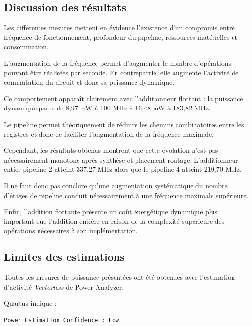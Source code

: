 \documentclass[12pt,a4paper]{article}
\begin{document}
\subsection{Discussion des résultats}

Les différentes mesures mettent en évidence l'existence d'un
compromis entre fréquence de fonctionnement, profondeur du pipeline,
ressources matérielles et consommation.

L'augmentation de la fréquence permet d'augmenter le nombre
d'opérations pouvant être réalisées par seconde. En contrepartie,
elle augmente l'activité de commutation du circuit et donc sa
puissance dynamique.

Ce comportement apparaît clairement avec l'additionneur flottant :
la puissance dynamique passe de 8,97 mW à 100 MHz à 16,48 mW
à 183,82 MHz.

Le pipeline permet théoriquement de réduire les chemins
combinatoires entre les registres et donc de faciliter
l'augmentation de la fréquence maximale.

Cependant, les résultats obtenus montrent que cette évolution
n'est pas nécessairement monotone après synthèse et
placement-routage. L'additionneur entier pipeline 2 atteint
337,27 MHz alors que le pipeline 4 atteint 210,70 MHz.

Il ne faut donc pas conclure qu'une augmentation systématique
du nombre d'étages de pipeline conduit nécessairement à une
fréquence maximale supérieure.

Enfin, l'addition flottante présente un coût énergétique dynamique
plus important que l'addition entière en raison de la complexité
supérieure des opérations nécessaires à son implémentation.



\subsection{Limites des estimations}

Toutes les mesures de puissance présentées ont été obtenues avec
l'estimation d'activité \textit{Vectorless} de Power Analyzer.

Quartus indique :

\begin{center}
    \texttt{Power Estimation Confidence : Low}
\end{center}
\end{document}
